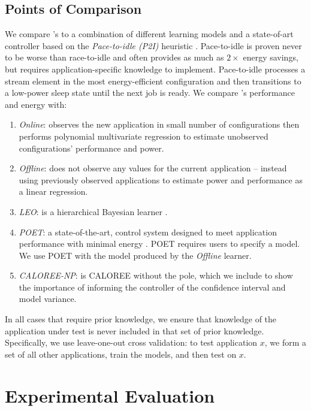 \subsection{Points of Comparison}
We compare \SYSTEM{}'s to a combination of different learning models
and a state-of-art controller based on the \emph{Pace-to-idle (P2I)}
heuristic \cite{kim-cpsna}.  Pace-to-idle is proven never to be worse
than race-to-idle and often provides as much as $2\times$ energy
savings, but requires application-specific knowledge to implement.
Pace-to-idle processes a stream element in the most energy-efficient
configuration and then transitions to a low-power sleep state until
the next job is ready.  We compare \SYSTEM{}'s performance and energy
with:
\begin{enumerate}
\item \textit{Online}: observes the new application in small number of
  configurations then performs polynomial multivariate regression to
  estimate unobserved configurations' performance and power. 
\item \textit{Offline}: does not observe any values for the current
  application -- instead using previously observed applications to
  estimate power and performance as a linear regression. 
\item \textit{LEO}: is a hierarchical Bayesian learner \cite{LEO}.
\item \textit{POET}: a state-of-the-art, control system designed to
  meet application performance with minimal energy \cite{POET}.  POET
  requires users to specify a model.  We use POET with the model
  produced by the \emph{Offline} learner.
\item \textit{CALOREE-NP}: is CALOREE without the pole, which we
  include to show the importance of informing the controller of the
  confidence interval and model variance.
\end{enumerate}

In all cases that require prior knowledge, we ensure that knowledge of
the application under test is never included in that set of prior
knowledge.  Specifically, we use leave-one-out cross validation: to
test application $x$, we form a set of all other applications, train
the models, and then test on $x$.


\section{Experimental Evaluation}

